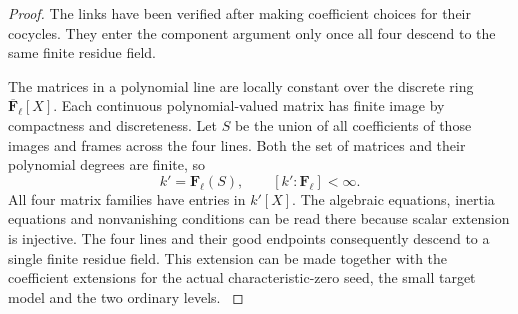 \begin{proof}

The links have been verified after making coefficient choices for their cocycles. They enter the component argument only once all four descend to the same finite residue field.

The matrices in a polynomial line are locally
constant over the discrete ring \(\overline{\mathbf F}_\ell[X]\).
Each continuous polynomial-valued matrix has finite image by
compactness and discreteness. Let \(S\) be the union of all coefficients of those images and frames across the four lines. Both the set of matrices and their polynomial degrees are finite, so
\[
 k'=\mathbf F_\ell(S),\qquad [k':\mathbf F_\ell]<\infty .
\]
All four matrix families have entries in \(k'[X]\).
The algebraic equations, inertia equations and
nonvanishing conditions can be read there
because scalar extension is injective. The four
lines and their good endpoints consequently
descend to a single finite residue field. This
extension can be made together with the
coefficient extensions for the actual
characteristic-zero seed, the small target model
and the two ordinary levels.
\label{cor:ordinary-count-iii-chain-2}
\end{proof}
